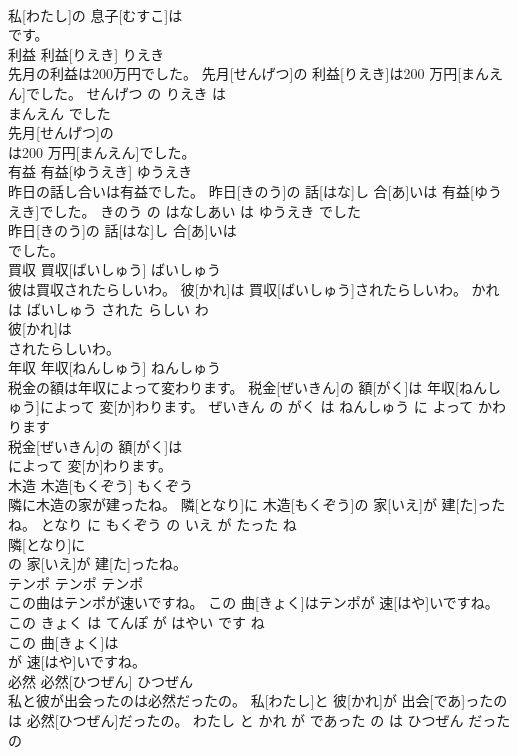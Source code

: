\documentclass[8pt]{extreport}
\begin{document}
\begin{CJK}{UTF8}{min}
\\	私[わたし]の 息子[むすこ]は
\\	です。			
\\	利益	利益[りえき]	りえき	
\\	先月の利益は200万円でした。	先月[せんげつ]の 利益[りえき]は200 万円[まんえん]でした。	せんげつ の りえき は 
\\	まんえん でした	
\\	先月[せんげつ]の
\\	は200 万円[まんえん]でした。			
\\	有益	有益[ゆうえき]	ゆうえき	
\\	昨日の話し合いは有益でした。	昨日[きのう]の 話[はな]し 合[あ]いは 有益[ゆうえき]でした。	きのう の はなしあい は ゆうえき でした	
\\	昨日[きのう]の 話[はな]し 合[あ]いは
\\	でした。			
\\	買収	買収[ばいしゅう]	ばいしゅう	
\\	彼は買収されたらしいわ。	彼[かれ]は 買収[ばいしゅう]されたらしいわ。	かれ は ばいしゅう された らしい わ	
\\	彼[かれ]は
\\	されたらしいわ。			
\\	年収	年収[ねんしゅう]	ねんしゅう	
\\	税金の額は年収によって変わります。	税金[ぜいきん]の 額[がく]は 年収[ねんしゅう]によって 変[か]わります。	ぜいきん の がく は ねんしゅう に よって かわります	
\\	税金[ぜいきん]の 額[がく]は
\\	によって 変[か]わります。			
\\	木造	木造[もくぞう]	もくぞう	
\\	隣に木造の家が建ったね。	隣[となり]に 木造[もくぞう]の 家[いえ]が 建[た]ったね。	となり に もくぞう の いえ が たった ね	
\\	隣[となり]に
\\	の 家[いえ]が 建[た]ったね。			
\\	テンポ	テンポ	テンポ	
\\	この曲はテンポが速いですね。	この 曲[きょく]はテンポが 速[はや]いですね。	この きょく は てんぽ が はやい です ね	
\\	この 曲[きょく]は
\\	が 速[はや]いですね。			
\\	必然	必然[ひつぜん]	ひつぜん	
\\	私と彼が出会ったのは必然だったの。	私[わたし]と 彼[かれ]が 出会[であ]ったのは 必然[ひつぜん]だったの。	わたし と かれ が であった の は ひつぜん だった の	

\end{CJK}
\end{document}
